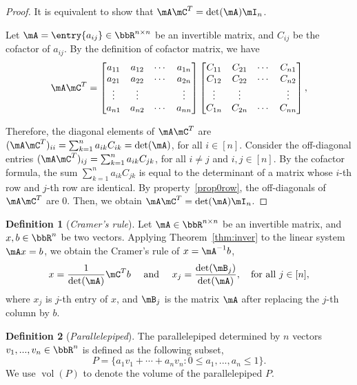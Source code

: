 \documentclass[11pt]{article}
\DeclareMathOperator{\vol}{vol}
\theoremstyle{plain}
\theoremstyle{definition}
\newtheorem{defn}{Definition}
\begin{document}
\begin{proof}
	It is equivalent to  show that $\mA \mC^T = \det(\mA) \mI_n$. 
	
	Let $\mA = \entry{a_{ij}} \in \bbR^{n \times n}$ be an invertible matrix, and $C_{ij}$ be the cofactor of $a_{ij}$. By the definition of cofactor matrix, we have
	\begin{align}
		\mA  \mC^T = \begin{bmatrix}
			a_{11} & a_{12} &\cdots &a_{1n}\\
			a_{21} & a_{22} &\cdots &a_{2n}\\
			\vdots & \vdots & & \vdots\\
			a_{n1} & a_{n2} &\cdots &a_{nn}\\
		\end{bmatrix} \begin{bmatrix}
			C_{11} & C_{21} &\cdots &C_{n1}\\
			C_{12} & C_{22} &\cdots &C_{n2}\\
			\vdots & \vdots & & \vdots\\
			C_{1n} & C_{2n} &\cdots &C_{nn}\\
		\end{bmatrix},
	\end{align}
	
	Therefore, the diagonal elements of $\mA \mC^T$ are $(\mA \mC^T)_{ii} = \sum_{k=1}^n a_{ik} C_{ik} = \det(\mA)$, for all $ i \in [n]$. Consider the off-diagonal entries $(\mA \mC^T)_{ij} = \sum_{k =1}^n a_{ik} C_{jk}$, for all  $i \neq j$ and $i, j \in [n]$. By the cofactor formula, the sum   $ \sum_{k =1}^n a_{ik} C_{jk}$ is equal to the determinant of a matrix whose $i$-th row and $j$-th row are identical. By property~\ref{prop0row}, the off-diagonals of $\mA \mC^T$ are 0. Then, we obtain $\mA \mC^T = \det(\mA) \mI_n$.
\end{proof}

\begin{defn}[\textit{Cramer's rule}]
Let  $\mA\in\bbR^{n \times n}$  be  an invertible matrix, and $ x, b \in \bbR^n$ be two vectors. Applying Theorem~\ref{thm:inver} to the linear system $\mA x=b$, we obtain the Cramer's rule of $x = \mA^{-1} b$, 
\[  x = \frac{1}{\det(\mA)} \mC^T b\quad \text{ and } \quad x_j = \frac{\det(\mB_j)}{\det(\mA)}, \quad \text{for all }j \in [n], \] 
	where $x_j$ is $j$-th entry of $x$, and $\mB_j$ is the matrix $\mA$ after replacing the $j$-th column by $b$.
\end{defn}

\begin{defn}[\textit{Parallelepiped}]
	The parallelepiped determined by $n$ vectors $v_1,...,v_n \in \bbR^n$ is defined as the following subset,
	\[ P = \{ a_1 v_1 + \cdots + a_n v_n \colon 0 \leq a_1,...,a_n \leq 1 \}. \]
	 We use $\vol(P)$ to denote the volume of the parallelepiped  $P$. 
\end{defn}
\end{document}
